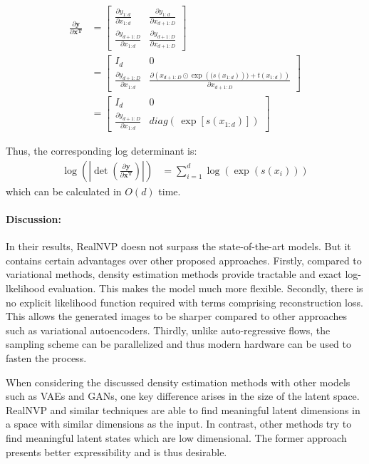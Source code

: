 \documentclass[runningheads]{llncs}
\begin{document}
\begin{align*}
\frac{\partial \mathbf{y}}{\partial \mathbf{x^T}} &= \begin{bmatrix}
\frac{\partial y_{1:d}}{\partial x_{1:d}} & \frac{\partial y_{1:d}}{\partial x_{d+1:D}} \\
\frac{\partial y_{d+1:D}}{\partial x_{1:d}} & \frac{\partial y_{d+1:D}}{\partial x_{d+1:D}} 
\end{bmatrix}\\
&= \begin{bmatrix}
I_{d} & 0 \\
\frac{\partial y_{d+1:D}}{\partial x_{1:d}} & \frac{\partial \left(x_{d+1:D} \odot \exp\left((s(x_{1:d})\right)) + t(x_{1:d})\right)}{\partial x_{d+1:D}} 
\end{bmatrix}\\
&= \begin{bmatrix}
I_{d} & 0 \\
\frac{\partial y_{d+1:D}}{\partial x_{1:d}} & diag\left(\,\exp[s(x_{1:d})]\right)
\end{bmatrix}
\end{align*}

Thus, the corresponding log determinant is:
\begin{align*}
\log\left( \left|\det(\frac{\partial \mathbf{y}}{\partial \mathbf{x^T}})\right|\right) &= \sum_{i=1}^{d}{\log(\exp(s(x_i)))}
\end{align*}
which can be calculated in $O(d)$ time.

\paragraph{Discussion:}
In their results, RealNVP doesn not surpass the state-of-the-art models. But it contains certain advantages over other proposed approaches. Firstly, compared to variational methods, density estimation methods provide tractable and exact log-lkelihood evaluation. This makes the model much more flexible. Secondly, there is no explicit likelihood function required with terms comprising reconstruction loss. This allows the generated images to be sharper compared to other approaches such as variational autoencoders. Thirdly, unlike auto-regressive flows, the sampling scheme can be parallelized and thus modern hardware can be used to fasten the process.

When considering the discussed density estimation methods with other models such as VAEs and GANs, one key difference arises in the size of the latent space. RealNVP and similar techniques are able to find meaningful latent dimensions in a space with similar dimensions as the input. In contrast, other methods try to find meaningful latent states which are low dimensional. The former approach presents better expressibility and is thus desirable. 
\end{document}
